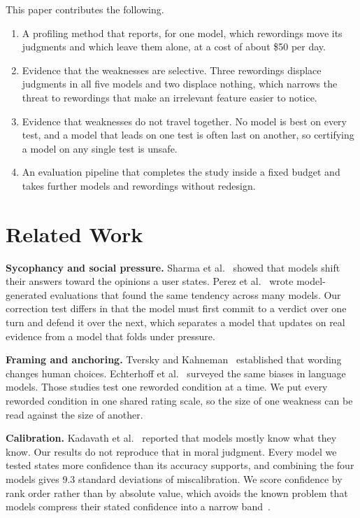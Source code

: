 \documentclass[conference]{IEEEtran}
\begin{document}
This paper contributes the following.

\begin{enumerate}
\item A profiling method that reports, for one model, which rewordings move its judgments and which leave them alone, at a cost of about \$50 per day.
\item Evidence that the weaknesses are selective. Three rewordings displace judgments in all five models and two displace nothing, which narrows the threat to rewordings that make an irrelevant feature easier to notice.
\item Evidence that weaknesses do not travel together. No model is best on every test, and a model that leads on one test is often last on another, so certifying a model on any single test is unsafe.
\item An evaluation pipeline that completes the study inside a fixed budget and takes further models and rewordings without redesign.
\end{enumerate}

\section{Related Work}

\textbf{Sycophancy and social pressure.} Sharma et al.~\cite{sharma2024sycophancy} showed that models shift their answers toward the opinions a user states. Perez et al.~\cite{perez2023model} wrote model-generated evaluations that found the same tendency across many models. Our correction test differs in that the model must first commit to a verdict over one turn and defend it over the next, which separates a model that updates on real evidence from a model that folds under pressure.

\textbf{Framing and anchoring.} Tversky and Kahneman~\cite{tversky1981framing} established that wording changes human choices. Echterhoff et al.~\cite{echterhoff2024cognitive} surveyed the same biases in language models. Those studies test one reworded condition at a time. We put every reworded condition in one shared rating scale, so the size of one weakness can be read against the size of another.

\textbf{Calibration.} Kadavath et al.~\cite{kadavath2022know} reported that models mostly know what they know. Our results do not reproduce that in moral judgment. Every model we tested states more confidence than its accuracy supports, and combining the four models gives 9.3 standard deviations of miscalibration. We score confidence by rank order rather than by absolute value, which avoids the known problem that models compress their stated confidence into a narrow band~\cite{niculescu2005predicting}.
\end{document}
